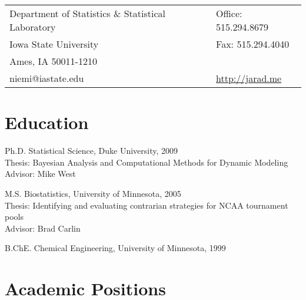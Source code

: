 \documentclass[overlapped,line]{res}
\begin{document}

\setlength{\leftmargini}{0em}
\renewcommand{\labelitemi}{}

\renewcommand{\namefont}{\large\textbf}



\begin{resume}

\begin{tabular}{ll}
  Department of Statistics \& Statistical Laboratory    & Office: 515.294.8679 \\
  Iowa State University                   &  Fax: \hspace{.07in} 515.294.4040 \\
  Ames, IA 50011-1210        & \\
  niemi@iastate.edu  & \url{http://jarad.me}
\end{tabular}




\section{\bf Education}
Ph.D. Statistical Science, Duke University, 2009 \\%
Thesis: Bayesian Analysis and Computational Methods for Dynamic Modeling\\
Advisor: Mike West

M.S. Biostatistics, University of Minnesota, 2005\\%
Thesis: Identifying and evaluating contrarian strategies for NCAA tournament pools \\
Advisor: Brad Carlin

B.ChE. Chemical Engineering, University of Minnesota, 1999%



\section{\bf Academic Positions}


\end{resume}
\end{document}
